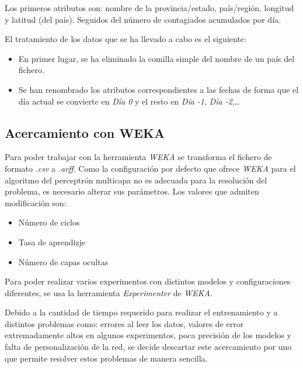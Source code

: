 \documentclass[12pt,a4paper, xcolor=table]{article}
\begin{document}
    \vspace{1mm}

    Los primeros atributos son: nombre de la provincia/estado, país/región, longitud y latitud (del país). Seguidos del número de contagiados acumulados por día.

    \vspace{3mm}

    El tratamiento de los datos que se ha llevado a cabo es el siguiente:

    \begin{itemize}
        \item En primer lugar, se ha eliminado la comilla simple del nombre de un país del fichero.
        \item Se han renombrado los atributos correspondientes a las fechas de forma que el día actual se convierte en \textit{Día 0} y el resto en \textit{Día -1}, \textit{Día -2},\dots
    \end{itemize}




    \subsection{Acercamiento con WEKA}

      Para poder trabajar con la herramienta \textit{WEKA} se transforma el fichero de formato \textit{.csv} a \textit{.arff}. Como la configuración por defecto que ofrece \textit{WEKA} para el algoritmo del perceptrón multicapa no es adecuada para la resolución del problema, es necesario alterar sus parámetros. Los valores que admiten modificación son:

      \begin{itemize}
        \item Número de ciclos
        \item Tasa de aprendizje
        \item Número de capas ocultas
      \end{itemize}

      Para poder realizar varios experimentos con distintos modelos y configuraciones diferentes, se usa la herramienta \textit{Experimenter} de \textit{WEKA}.

      \vspace{1mm}

      Debido a la cantidad de tiempo requerido para realizar el entrenamiento y a distintos problemas como: errores al leer los datos, valores de error extremadamente altos en algunos experimentos, poca precisión de los modelos y falta de personalización de la red, se decide descartar este acercamiento por uno que permite resolver estos problemas de manera sencilla.
\end{document}
